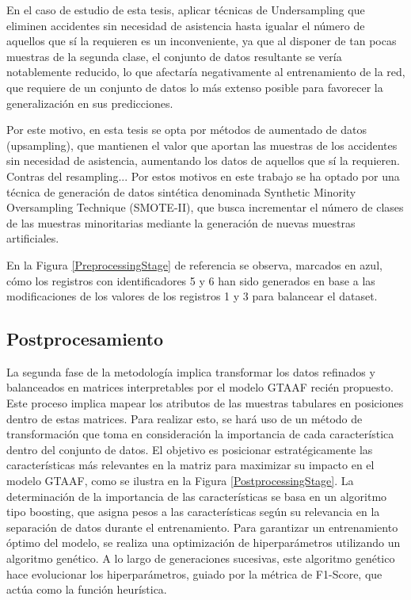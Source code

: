 \documentclass{uathesis-es}
\begin{document}
{	En el caso de estudio de esta tesis, aplicar técnicas de Undersampling que eliminen accidentes sin necesidad de asistencia hasta igualar el número de aquellos que sí la requieren es un inconveniente, ya que al disponer de tan pocas muestras de la segunda clase, el conjunto de datos resultante se vería notablemente reducido, lo que afectaría negativamente al entrenamiento de la red, que requiere de un conjunto de datos lo más extenso posible para favorecer la generalización en sus predicciones.
	
	Por este motivo, en esta tesis se opta por métodos de aumentado de datos (upsampling), que mantienen el valor que aportan las muestras de los accidentes sin necesidad de asistencia, aumentando los datos de aquellos que sí la requieren. Contras del resampling... Por estos motivos en este trabajo se ha optado por una técnica de generación de datos sintética denominada Synthetic Minority Oversampling Technique (SMOTE-II), que busca incrementar el número de clases de las muestras minoritarias mediante la generación de nuevas muestras artificiales.
	
	En la Figura \ref{PreprocessingStage} de referencia se observa, marcados en azul, cómo los registros con identificadores 5 y 6 han sido generados en base a las modificaciones de los valores de los registros 1 y 3 para balancear el dataset.
	
	
	\subsection{Postprocesamiento}
	
	La segunda fase de la metodología implica transformar los datos refinados y balanceados en matrices interpretables por el modelo GTAAF recién propuesto. Este proceso implica mapear los atributos de las muestras tabulares en posiciones dentro de estas matrices. Para realizar esto, se hará uso de un método de transformación que toma en consideración la importancia de cada característica dentro del conjunto de datos. El objetivo es posicionar estratégicamente las características más relevantes en la matriz para maximizar su impacto en el modelo GTAAF, como se ilustra en la Figura \ref{PostprocessingStage}. La determinación de la importancia de las características se basa en un algoritmo tipo boosting, que asigna pesos a las características según su relevancia en la separación de datos durante el entrenamiento. Para garantizar un entrenamiento óptimo del modelo, se realiza una optimización de hiperparámetros utilizando un algoritmo genético. A lo largo de generaciones sucesivas, este algoritmo genético hace evolucionar los hiperparámetros, guiado por la métrica de F1-Score, que actúa como la función heurística.
	
}
\end{document}
